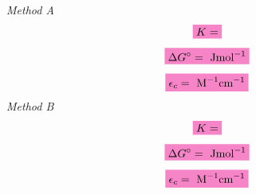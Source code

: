 \textit{Method A}
\begin{equation*}
    \mathcolorbox{Lavender}{K = }
\end{equation*}
\begin{equation*}
    \mathcolorbox{Lavender}{\Delta G^{\circ} =  \text{ Jmol}^{-1}}
\end{equation*}
\begin{equation*}
    \mathcolorbox{Lavender}{\epsilon_c = \text{ M}^{-1}\text{cm} ^ {-1}}
\end{equation*}
\textit{Method B}
\begin{equation*}
    \mathcolorbox{Lavender}{K = }
\end{equation*}
\begin{equation*}
    \mathcolorbox{Lavender}{\Delta G^{\circ} =  \text{ Jmol}^{-1}}
\end{equation*}
\begin{equation*}
    \mathcolorbox{Lavender}{\epsilon_c = \text{ M}^{-1}\text{cm} ^ {-1}}
\end{equation*}